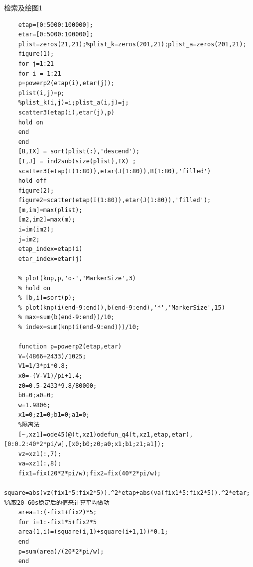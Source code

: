 \documentclass{article}
\numberwithin{equation}{subsection}
\begin{document}
检索及绘图1
\begin{lstlisting}
    etap=[0:5000:100000];
    etar=[0:5000:100000];
    plist=zeros(21,21);%plist_k=zeros(201,21);plist_a=zeros(201,21);
    figure(1);
    for j=1:21
    for i = 1:21
    p=powerp2(etap(i),etar(j));
    plist(i,j)=p;
    %plist_k(i,j)=i;plist_a(i,j)=j;
    scatter3(etap(i),etar(j),p)
    hold on
    end
    end
    [B,IX] = sort(plist(:),'descend');
    [I,J] = ind2sub(size(plist),IX) ;
    scatter3(etap(I(1:80)),etar(J(1:80)),B(1:80),'filled')
    hold off 
    figure(2);
    figure2=scatter(etap(I(1:80)),etar(J(1:80)),'filled');
    [m,im]=max(plist);
    [m2,im2]=max(m);
    i=im(im2);
    j=im2;
    etap_index=etap(i)
    etar_index=etar(j)

    % plot(knp,p,'o-','MarkerSize',3)
    % hold on
    % [b,i]=sort(p);
    % plot(knp(i(end-9:end)),b(end-9:end),'*','MarkerSize',15)
    % max=sum(b(end-9:end))/10;
    % index=sum(knp(i(end-9:end)))/10;

    function p=powerp2(etap,etar)
    V=(4866+2433)/1025; 
    V1=1/3*pi*0.8; 
    x0=-(V-V1)/pi+1.4;
    z0=0.5-2433*9.8/80000;
    b0=0;a0=0;
    w=1.9806;
    x1=0;z1=0;b1=0;a1=0;
    %隔离法
    [~,xz1]=ode45(@(t,xz1)odefun_q4(t,xz1,etap,etar),[0:0.2:40*2*pi/w],[x0;b0;z0;a0;x1;b1;z1;a1]);
    vz=xz1(:,7);
    va=xz1(:,8);
    fix1=fix(20*2*pi/w);fix2=fix(40*2*pi/w);
    square=abs(vz(fix1*5:fix2*5)).^2*etap+abs(va(fix1*5:fix2*5)).^2*etar; %%取20-60s稳定后的值来计算平均做功
    area=1:(-fix1+fix2)*5;
    for i=1:-fix1*5+fix2*5
    area(1,i)=(square(i,1)+square(i+1,1))*0.1;
    end
    p=sum(area)/(20*2*pi/w);
    end
\end{lstlisting}
\end{document}
